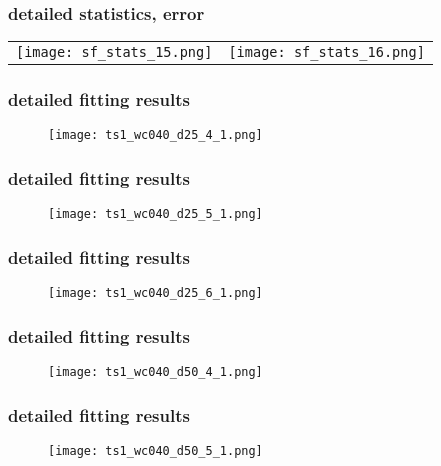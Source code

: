 	\begin{frame}
		\frametitle{\appendixname{} \textendash{} detailed statistics, error}
		\begin{tabular}{ r r }
			\texttt{[image: sf\_stats\_15.png]} & 
			\texttt{[image: sf\_stats\_16.png]}
		\end{tabular}
	\end{frame}

	\def\gw{130mm}
	\begin{frame}
		\frametitle{\appendixname{} \textendash{} detailed fitting results}\label{app:details:ts1}
		\begin{figure}
			\texttt{[image: ts1\_wc040\_d25\_4\_1.png]}
		\end{figure}
	\end{frame}

	\begin{frame}
		\frametitle{\appendixname{} \textendash{} detailed fitting results}
		\begin{figure}
			\texttt{[image: ts1\_wc040\_d25\_5\_1.png]}
		\end{figure}
	\end{frame}

	\begin{frame}
		\frametitle{\appendixname{} \textendash{} detailed fitting results}
		\begin{figure}
			\texttt{[image: ts1\_wc040\_d25\_6\_1.png]}
		\end{figure}
	\end{frame}

	\begin{frame}
		\frametitle{\appendixname{} \textendash{} detailed fitting results}
		\begin{figure}
			\texttt{[image: ts1\_wc040\_d50\_4\_1.png]}
		\end{figure}
	\end{frame}

	\begin{frame}
		\frametitle{\appendixname{} \textendash{} detailed fitting results}
		\begin{figure}
			\texttt{[image: ts1\_wc040\_d50\_5\_1.png]}
		\end{figure}
	\end{frame}


